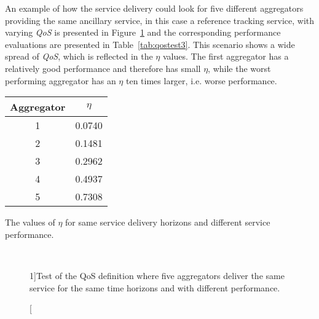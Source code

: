 An example of how the service delivery could look for five different aggregators providing the same ancillary service, in this case a reference tracking service, with varying \emph{QoS} is presented in Figure~\ref{fig:indextest3} and the corresponding performance evaluations are presented in Table~\ref{tab:qostest3}. This scenario shows a wide spread of \emph{QoS}, which is reflected in the $\eta$ values. The first aggregator has a relatively good performance and therefore has small $\eta$, while the worst performing aggregator has an $\eta$ ten times larger, i.e. worse performance.
\begin{margintable}[-5\baselineskip]%
	\centering
	\begin{tabular}{cc}
		\toprule
		Aggregator & $\eta$ \\
		\midrule
		1 & 0.0740 \\
		2 & 0.1481 \\
		3 & 0.2962 \\
		4 & 0.4937 \\
		5 & 0.7308 \\
		\bottomrule
	\end{tabular}
	\caption{The values of $\eta$ for same service delivery horizons and different service performance.}
	\label{tab:qostest3}
\end{margintable}

\begin{figure}
\centering
{} \\
\caption[][1\baselineskip]{Test of the QoS definition where five aggregators deliver the same service for the same time horizons and with different performance.}
\label{fig:indextest3}
\end{figure}

